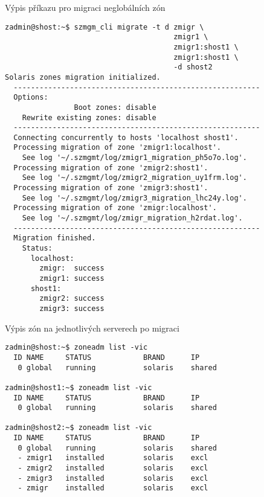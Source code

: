 \begin{listing}[ht]
  \caption{Výpis příkazu pro migraci neglobálních zón}
  \label{code:test:migration}
  \begin{verbatim}
zadmin@shost:~$ szmgm_cli migrate -t d zmigr \
                                       zmigr1 \
                                       zmigr1:shost1 \
                                       zmigr1:shost1 \
                                       -d shost2
Solaris zones migration initialized.
  ---------------------------------------------------------
  Options:
                Boot zones: disable
    Rewrite existing zones: disable
  ---------------------------------------------------------
  Connecting concurrently to hosts 'localhost shost1'.
  Processing migration of zone 'zmigr1:localhost'. 
    See log '~/.szmgmt/log/zmigr1_migration_ph5o7o.log'. 
  Processing migration of zone 'zmigr2:shost1'. 
    See log '~/.szmgmt/log/zmigr2_migration_uy1frm.log'.
  Processing migration of zone 'zmigr3:shost1'. 
    See log '~/.szmgmt/log/zmigr3_migration_lhc24y.log'.
  Processing migration of zone 'zmigr:localhost'. 
    See log '~/.szmgmt/log/zmigr_migration_h2rdat.log'.
  ---------------------------------------------------------
  Migration finished.
    Status:
      localhost:
        zmigr:  success
        zmigr1: success
      shost1:
        zmigr2: success
        zmigr3: success
  \end{verbatim}
\end{listing}

\begin{listing}[ht]
  \caption{Výpis zón na jednotlivých serverech po migraci}
  \label{code:test:migration:list}
  \begin{verbatim}
zadmin@shost:~$ zoneadm list -vic
  ID NAME     STATUS            BRAND      IP    
   0 global   running           solaris    shared

zadmin@shost1:~$ zoneadm list -vic
  ID NAME     STATUS            BRAND      IP    
   0 global   running           solaris    shared
   
zadmin@shost2:~$ zoneadm list -vic
  ID NAME     STATUS            BRAND      IP    
   0 global   running           solaris    shared
   - zmigr1   installed         solaris    excl  
   - zmigr2   installed         solaris    excl
   - zmigr3   installed         solaris    excl  
   - zmigr    installed         solaris    excl  
  \end{verbatim}
\end{listing}

